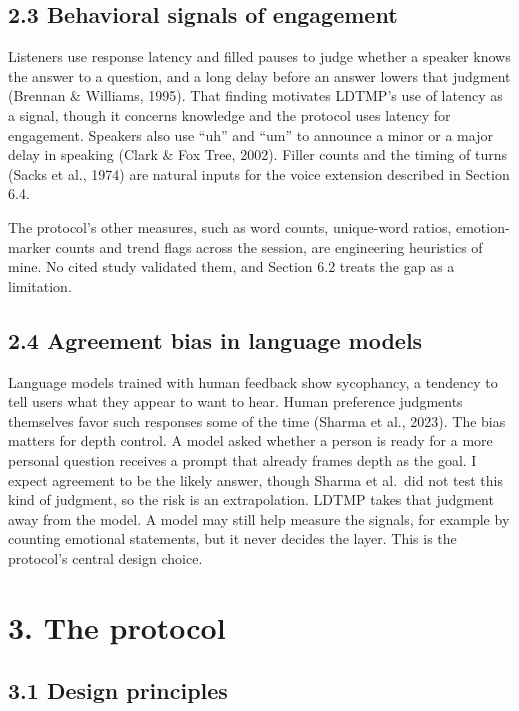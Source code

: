 \documentclass[11pt]{article}
\begin{document}
\subsection{2.3 Behavioral signals of engagement}

Listeners use response latency and filled pauses to judge whether a
speaker knows the answer to a question, and a long delay before an
answer lowers that judgment (Brennan \& Williams, 1995). That finding
motivates LDTMP's use of latency as a signal, though it concerns
knowledge and the protocol uses latency for engagement. Speakers also
use ``uh'' and ``um'' to announce a minor or a major delay in speaking
(Clark \& Fox Tree, 2002). Filler counts and the timing of turns (Sacks
et al., 1974) are natural inputs for the voice extension described in
Section 6.4.

The protocol's other measures, such as word counts, unique-word ratios,
emotion-marker counts and trend flags across the session, are
engineering heuristics of mine. No cited study validated them, and
Section 6.2 treats the gap as a limitation.

\subsection{2.4 Agreement bias in language models}

Language models trained with human feedback show sycophancy, a tendency
to tell users what they appear to want to hear. Human preference
judgments themselves favor such responses some of the time (Sharma et
al., 2023). The bias matters for depth control. A model asked whether a
person is ready for a more personal question receives a prompt that
already frames depth as the goal. I expect agreement to be the likely
answer, though Sharma et al.~did not test this kind of judgment, so the
risk is an extrapolation. LDTMP takes that judgment away from the model.
A model may still help measure the signals, for example by counting
emotional statements, but it never decides the layer. This is the
protocol's central design choice.

\section{3. The protocol}

\subsection{3.1 Design principles}
\end{document}
